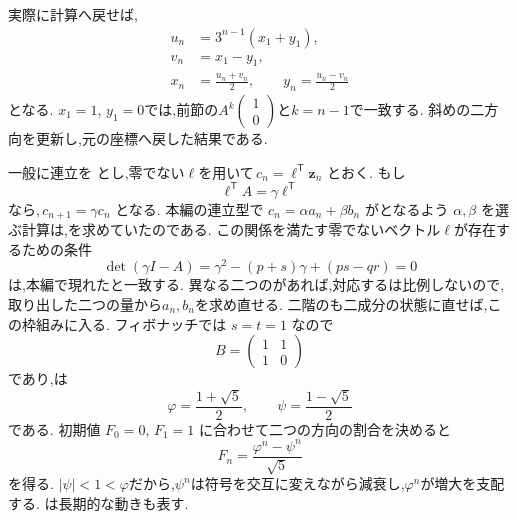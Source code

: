 実際に計算へ戻せば,
\[
  \begin{aligned}
    u_n&=3^{n-1}(x_1+y_1),\\
    v_n&=x_1-y_1,\\
    x_n&=\frac{u_n+v_n}{2},\qquad
    y_n=\frac{u_n-v_n}{2}
  \end{aligned}
\]
となる.
$x_1=1$, $y_1=0$では,前節の$A^k\begin{pmatrix}1\\0\end{pmatrix}$と$k=n-1$で一致する.
斜めの二方向を更新し,元の座標へ戻した結果である.

一般に連立を
\BookMathLayout{\[
    \boldsymbol{z}_{n+1}=A\boldsymbol{z}_n,
    \qquad
    \boldsymbol{z}_n=\begin{pmatrix}a_n\\b_n\end{pmatrix},
    \qquad
    A=\begin{pmatrix}p&q\\r&s\end{pmatrix}
  \]}{
  \[
    \begin{aligned}
      \boldsymbol z_{n+1}&=A\boldsymbol z_n,\\
      \boldsymbol z_n&=\begin{pmatrix}a_n\\b_n\end{pmatrix},\quad
      A=\begin{pmatrix}p&q\\r&s\end{pmatrix}
    \end{aligned}
  \]
}
とし,零でない$\boldsymbol{\ell}$を用いて$\,c_n=\boldsymbol{\ell}^{\mathsf T}\boldsymbol{z}_n$ とおく.
もし
\[
  \boldsymbol{\ell}^{\mathsf T}A
  =\gamma\boldsymbol{\ell}^{\mathsf T}
\]
なら,$\,c_{n+1}=\gamma c_n$ となる.
本編の連立型で $c_n=\alpha a_n+\beta b_n$ がとなるよう $\alpha,\beta$ を選ぶ計算は,を求めていたのである.
この関係を満たす零でないベクトル$\boldsymbol{\ell}$が存在するための条件
\[
  \det(\gamma I-A)
  =\gamma^2-(p+s)\gamma+(ps-qr)=0
\]
は,本編で現れたと一致する.
異なる二つのがあれば,対応するは比例しないので,取り出した二つの量から$a_n,b_n$を求め直せる.
二階のも二成分の状態に直せば,この枠組みに入る.
フィボナッチでは $s=t=1$ なので
\[
  B=\begin{pmatrix}1&1\\1&0\end{pmatrix}
\]
であり,は
\[
  \varphi=\frac{1+\sqrt5}{2},
  \qquad
  \psi=\frac{1-\sqrt5}{2}
\]
である.
初期値 $F_0=0,\,F_1=1$ に合わせて二つの方向の割合を決めると
\[
  F_n=\frac{\varphi^n-\psi^n}{\sqrt5}
\]
を得る.
$|\psi|<1<\varphi$だから,$\psi^n$は符号を交互に変えながら減衰し,$\varphi^n$が増大を支配する.
は長期的な動きも表す.

